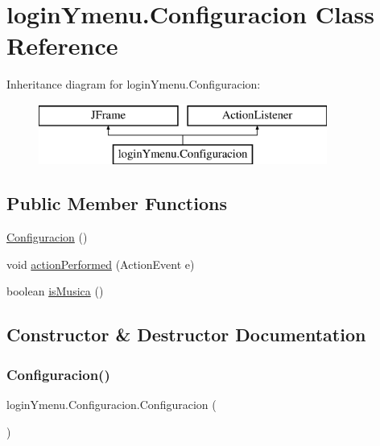 \hypertarget{classlogin_ymenu_1_1_configuracion}{}\section{login\+Ymenu.\+Configuracion Class Reference}
\label{classlogin_ymenu_1_1_configuracion}
Inheritance diagram for login\+Ymenu.\+Configuracion\+:\begin{figure}[H]
\begin{center}
\leavevmode
\includegraphics[height=2.000000cm]{classlogin_ymenu_1_1_configuracion}
\end{center}
\end{figure}
\subsection*{Public Member Functions}
\begin{DoxyCompactItemize}
\item 
\mbox{\hyperlink{classlogin_ymenu_1_1_configuracion_aedc514da61a3f325367ebb320b213d39}{Configuracion}} ()
\item 
void \mbox{\hyperlink{classlogin_ymenu_1_1_configuracion_a4745a6a0776c7e9bfe9243bfa5f484a9}{action\+Performed}} (Action\+Event e)
\item 
boolean \mbox{\hyperlink{classlogin_ymenu_1_1_configuracion_aa7598b96e52ca5f7d3ec7d50e7c6b79c}{is\+Musica}} ()
\end{DoxyCompactItemize}


\subsection{Constructor \& Destructor Documentation}
\mbox{\label{classlogin_ymenu_1_1_configuracion_aedc514da61a3f325367ebb320b213d39}} 
\subsubsection{\texorpdfstring{Configuracion()}{Configuracion()}}
{\footnotesize\ttfamily login\+Ymenu.\+Configuracion.\+Configuracion (\begin{DoxyParamCaption}{ }\end{DoxyParamCaption})}



